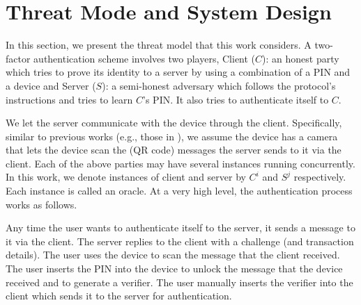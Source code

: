 


\section{Threat Mode and System Design}\label{sec::model}

In this section, we present the threat model that this work considers. A two-factor authentication scheme involves two players,
%
%
%
%
 {Client ($C$)}: an honest party which tries to prove its identity to a server by using a combination of a PIN and a device and {Server ($S$)}:  a semi-honest adversary which follows the protocol's instructions and tries to learn $C$'s PIN. It also tries to authenticate itself to $C$.  


We let the server communicate with the device through the client. Specifically, similar to previous works (e.g., those in \cite{JareckiJKSS21,Digipass-website,Gemalto}), we assume the device has a camera that lets the device scan the (QR code) messages the server sends to it via the client. Each of the above parties may have several instances running concurrently. In this work, we denote instances of client and server by  $C^{i}$ and  $S^{j}$ respectively. Each instance is called an oracle.  At a very high level, the authentication process works as follows. 


Any time the user wants to authenticate itself to the server, it sends a message to it via the client.  The server replies to the client with a challenge (and transaction details). The user uses the device to scan the message that the client received. The user inserts the PIN into the device to unlock the message that the device received and to generate a verifier. The user manually inserts the verifier into the client which sends it to the server for authentication. 


